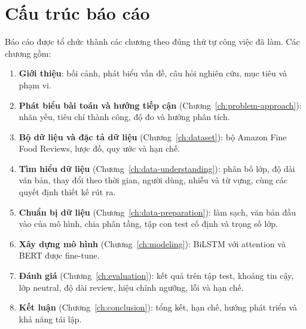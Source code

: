 \section{Cấu trúc báo cáo}
\label{sec:1-6}

Báo cáo được tổ chức thành các chương theo đúng thứ tự công việc đã làm. Các chương gồm:

\begin{enumerate}
    \item \textbf{Giới thiệu}: bối cảnh, phát biểu vấn đề, câu hỏi nghiên cứu, mục tiêu và phạm vi.
    \item \textbf{Phát biểu bài toán và hướng tiếp cận} (Chương~\ref{ch:problem-approach}): nhãn yếu, tiêu chí thành công, độ đo và hướng phân tích.
    \item \textbf{Bộ dữ liệu và đặc tả dữ liệu} (Chương~\ref{ch:dataset}): bộ Amazon Fine Food Reviews, lược đồ, quy ước và hạn chế.
    \item \textbf{Tìm hiểu dữ liệu} (Chương~\ref{ch:data-understanding}): phân bố lớp, độ dài văn bản, thay đổi theo thời gian, người dùng, nhiễu và từ vựng, cùng các quyết định thiết kế rút ra.
    \item \textbf{Chuẩn bị dữ liệu} (Chương~\ref{ch:data-preparation}): làm sạch, văn bản đầu vào của mô hình, chia phân tầng, tập con test cố định và trọng số lớp.
    \item \textbf{Xây dựng mô hình} (Chương~\ref{ch:modeling}): BiLSTM với attention và BERT được fine-tune.
    \item \textbf{Đánh giá} (Chương~\ref{ch:evaluation}): kết quả trên tập test, khoảng tin cậy, lớp neutral, độ dài review, hiệu chỉnh ngưỡng, lỗi và hạn chế.
    \item \textbf{Kết luận} (Chương~\ref{ch:conclusion}): tổng kết, hạn chế, hướng phát triển và khả năng tái lập.
\end{enumerate}
